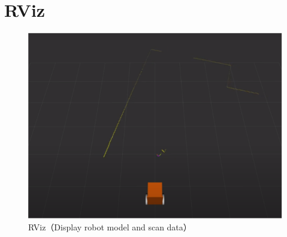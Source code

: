 
\section{RViz}

\begin{figure}[h]
  \centering
  \includegraphics[keepaspectratio, scale=0.60] {images/RobotGuidance_rviz.png}
  \caption{RViz（Display robot model and scan data）}
  \label{Fig:RobotGuidance_rviz}
\end{figure}

\newpage

